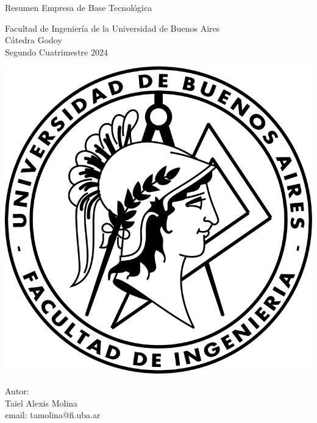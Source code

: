 \documentclass{article}
\begin{document}
\begin{titlepage}
  \vspace*{1cm}

  \begin{center}
    {\Huge{Resumen Empresa de Base Tecnológica}}
  \end{center}

  \vspace{0.4cm}

  \begin{center}
    {\LARGE{Facultad de Ingeniería de la Universidad de Buenos Aires}}\\
    \vspace{0.3cm}
    {\Large{Cátedra Godoy}}\\
    \vspace{0.3cm}
    {\large{Segundo Cuatrimestre 2024}}\\
  \end{center}

  \vspace{0.8cm}
  \begin{center}
    \includegraphics[scale=0.8]{Logo-fiuba}
  \end{center}

  \vspace{0.3cm}
  \begin{center}
    {\Large{Autor:}}\\
    \vspace{0.2cm}
    Taiel Alexis Molina\\
    {\small{email: tamolina@fi.uba.ar}}
  \end{center}
   

\end{titlepage}
\end{document}

